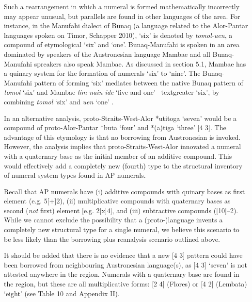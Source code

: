 Such a rearrangement in which a numeral is formed mathematically incorrectly may appear unusual, but parallels are found in other languages of the area. For instance, in the Manufahi dialect of Bunaq (a language related to the Alor-Pantar languages spoken on Timor, Schapper 2010), {\textquoteleft}six{\textquoteright} is denoted by \textit{tomol-uen}, a compound of etymological {\textquoteleft}six{\textquoteright} and {\textquoteleft}one{\textquoteright}. Bunaq-Manufahi is spoken in an area dominated by speakers of the Austronesian language Mambae and all Bunaq-Manufahi spreakers also speak Mambae. As discussed in section 5.1, Mambae has a quinary system for the formation of numerals {\textquoteleft}six{\textquoteright} to {\textquoteleft}nine{\textquoteright}. The Bunaq-Manufahi pattern of forming {\textquoteleft}six{\textquoteright} mediates between the native Bunaq pattern of \textit{tomol} {\textquoteleft}six{\textquoteright} and Mambae \textit{lim-nain-ide} {\textquoteleft}five-and-one{\textquoteright} {\
textgreater} {\textquoteleft}six{\textquoteright}, by combining \textit{tomol} {\textquoteleft}six{\textquoteright} and \textit{uen }{\textquoteleft}one{\textquoteright} .

In an alternative analysis, proto-Straits-West-Alor *{\texthtb}utitoga {\textquoteleft}seven{\textquoteright} would be a compound of proto-Alor-Pantar *buta {\textquoteleft}four{\textquoteright} and *(a)tiga {\textquoteleft}three{\textquoteright} [4 3]. The advantage of this etymology is that no borrowing from Austronesian is invoked. However, the analysis implies that proto-Straits-West-Alor innovated a numeral with a quaternary base as the initial member of an additive compound. This would effectively add a completely new (fourth) type to the structural inventory of numeral system types found in AP numerals. 

Recall that AP numerals have (i) additive compounds with quinary bases as first element (e.g. 5[+]2), (ii) multiplicative compounds with quaternary bases as second (\textit{not} first) element [e.g. 2[x]4], and (iii) subtractive compounds ([10]--2). While we cannot exclude the possibility that a (proto-)language invents a completely new structural type for a single numeral, we believe this scenario to be less likely than the borrowing plus reanalysis scenario outlined above. 

It should be added that there is no evidence that a new [4 3] pattern could have been borrowed from neighbouring Austronesian language(s), as [4 3] {\textquoteleft}seven{\textquoteright} is not attested anywhere in the region. Numerals with a quaternary base are found in the region, but these are all multiplicative forms: [2 4] (Flores) or [4 2] (Lembata) {\textquoteleft}eight{\textquoteright} (see Table 10  and Appendix II). 

